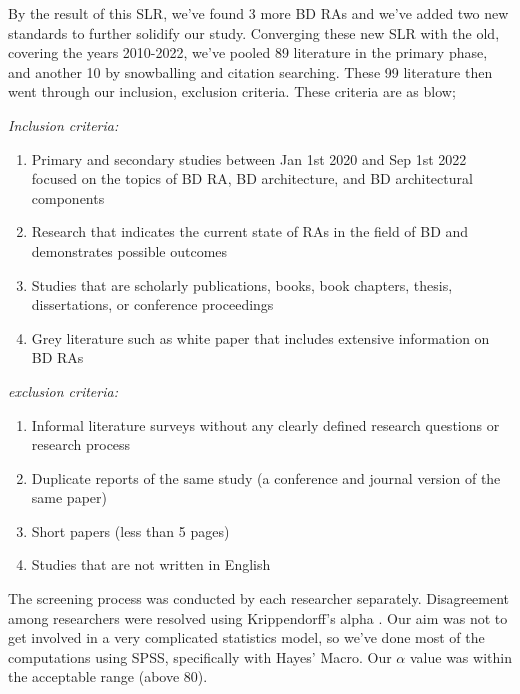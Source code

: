 \documentclass{bmcart}
\begin{document}
\begin{enumerate}
    By the result of this SLR, we've found 3 more BD RAs \cite{AtaeiApsec,castellanos2021smart,sang2017simplifying} and we've added two new standards \cite{ISO20546,ISO20547} to further solidify our study. Converging these new SLR with the old, covering the years 2010-2022, we've pooled 89 literature in the primary phase, and another 10 by snowballing and citation searching. These 99 literature then went through our inclusion, exclusion criteria. These criteria are as blow;

        \emph{Inclusion criteria:}
        \begin{enumerate}
            \item Primary and secondary studies between Jan 1st 2020 and Sep 1st 2022 focused on the topics of BD RA, BD architecture, and BD architectural components
            \item Research that indicates the current state of RAs in the field of BD and demonstrates possible outcomes
            \item Studies that are scholarly publications, books, book chapters, thesis, dissertations, or conference proceedings 
            \item Grey literature such as white paper that includes extensive information on BD RAs
        \end{enumerate}
        \emph{exclusion criteria:}
        \begin{enumerate}
            \item Informal literature surveys without any clearly defined research questions or research process
            \item Duplicate reports of the same study (a conference and journal version of the same paper)
            \item Short papers (less than 5 pages)
            \item Studies that are not written in English
        \end{enumerate}


\end{enumerate}

The screening process was conducted by each researcher separately. Disagreement among researchers were resolved using Krippendorff’s alpha \cite{krippendorff2011computing}. Our aim was not to get involved in a very complicated statistics model, so we've done most of the computations using SPSS, specifically with Hayes’ Macro. Our $ \alpha $ value was within the acceptable range (above 80). 
\end{document}
